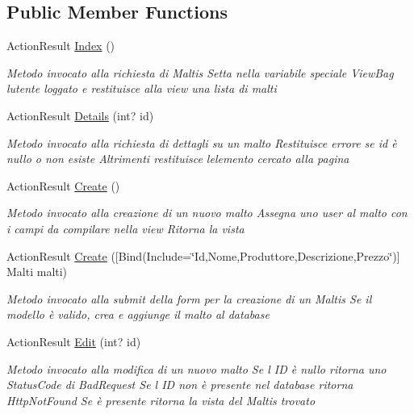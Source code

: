 \subsection*{Public Member Functions}
\begin{DoxyCompactItemize}
\item 
Action\+Result \mbox{\hyperlink{class_brew_day2_1_1_controllers_1_1_maltis_controller_aa27332bf97a63faff79d3020fbf75b10}{Index}} ()
\begin{DoxyCompactList}\small\item\em Metodo invocato alla richiesta di Maltis Setta nella variabile speciale View\+Bag l\textquotesingle{}utente loggato e restituisce alla view una lista di malti \end{DoxyCompactList}\item 
Action\+Result \mbox{\hyperlink{class_brew_day2_1_1_controllers_1_1_maltis_controller_aedb5d2ed75c992906e8dd87cca2d979a}{Details}} (int? id)
\begin{DoxyCompactList}\small\item\em Metodo invocato alla richiesta di dettagli su un malto Restituisce errore se id è nullo o non esiste Altrimenti restituisce l\textquotesingle{}elemento cercato alla pagina \end{DoxyCompactList}\item 
Action\+Result \mbox{\hyperlink{class_brew_day2_1_1_controllers_1_1_maltis_controller_ab47f04b509725d05d3ecba882a929213}{Create}} ()
\begin{DoxyCompactList}\small\item\em Metodo invocato alla creazione di un nuovo malto Assegna uno user al malto con i campi da compilare nella view Ritorna la vista \end{DoxyCompactList}\item 
Action\+Result \mbox{\hyperlink{class_brew_day2_1_1_controllers_1_1_maltis_controller_adf080c6f3b470d6f97c1756e727309e5}{Create}} (\mbox{[}Bind(Include=\char`\"{}Id,Nome,Produttore,Descrizione,Prezzo\char`\"{})\mbox{]} Malti malti)
\begin{DoxyCompactList}\small\item\em Metodo invocato alla submit della form per la creazione di un Maltis Se il modello è valido, crea e aggiunge il malto al database \end{DoxyCompactList}\item 
Action\+Result \mbox{\hyperlink{class_brew_day2_1_1_controllers_1_1_maltis_controller_ae5e372d2e9a301d3028696daa2e0b182}{Edit}} (int? id)
\begin{DoxyCompactList}\small\item\em Metodo invocato alla modifica di un nuovo malto Se l\textquotesingle{} ID è nullo ritorna uno Status\+Code di Bad\+Request Se l\textquotesingle{} ID non è presente nel database ritorna Http\+Not\+Found Se è presente ritorna la vista del Maltis trovato \end{DoxyCompactList}\item 

\end{DoxyCompactItemize}
